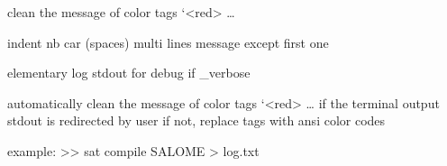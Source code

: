 \documentclass[a4paper,10pt,english]{sphinxmanual}
\begin{document}

\begin{fulllineitems}
\label{\detokenize{apidoc_src/src:src.coloringSat.cleanColors}}
clean the message of color tags ‘\textless{}red\textgreater{} …

\end{fulllineitems}


\begin{fulllineitems}
\label{\detokenize{apidoc_src/src:src.coloringSat.indent}}
indent nb car (spaces) multi lines message except first one

\end{fulllineitems}


\begin{fulllineitems}
\label{\detokenize{apidoc_src/src:src.coloringSat.log}}
elementary log stdout for debug if \_verbose

\end{fulllineitems}


\begin{fulllineitems}
\label{\detokenize{apidoc_src/src:src.coloringSat.replace}}
\end{fulllineitems}


\begin{fulllineitems}
\label{\detokenize{apidoc_src/src:src.coloringSat.toColor}}
automatically clean the message of color tags ‘\textless{}red\textgreater{} … 
if the terminal output stdout is redirected by user
if not, replace tags with ansi color codes

example:
\textgreater{}\textgreater{} sat compile SALOME \textgreater{} log.txt

\end{fulllineitems}
\end{document}
